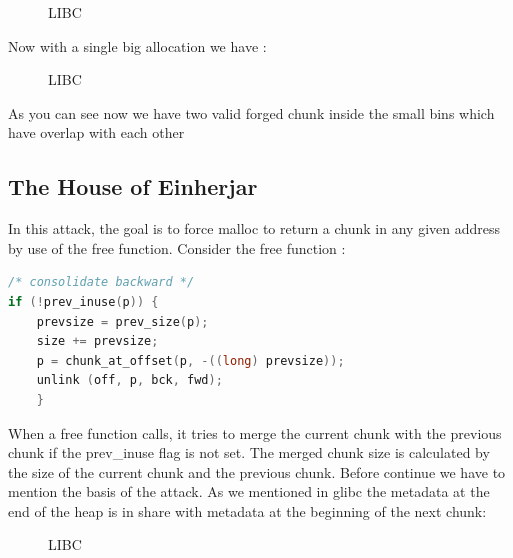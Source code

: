 \documentclass{masterthesis}
\begin{document}
\begin{figure}[h!]
  \caption{LIBC}
\end{figure}

Now with a single big allocation we have :
\begin{figure}[h!]
  \caption{LIBC}
\end{figure}

As you can see now we have two valid forged chunk inside the small bins which have overlap with each other

\subsection{The House of Einherjar}
In this attack, the goal is to force malloc to return a chunk in any given address by use of the free function. Consider the free function :
\begin{lstlisting}[language=c,frame=tlrb]
/* consolidate backward */
if (!prev_inuse(p)) {
    prevsize = prev_size(p);
    size += prevsize;
    p = chunk_at_offset(p, -((long) prevsize));
	unlink (off, p, bck, fwd);
	} 
 \end{lstlisting}
When a free function calls, it tries to merge the current chunk with the previous chunk if the prev\_inuse flag is not set. The merged chunk size is calculated by the size of the current chunk and the previous chunk. Before continue we have to mention the basis of the attack. As we mentioned in glibc the metadata at the end of the heap is in share with metadata at the beginning of the next chunk: 
\begin{figure}[h!]
  \caption{LIBC}
\end{figure}
\end{document}
